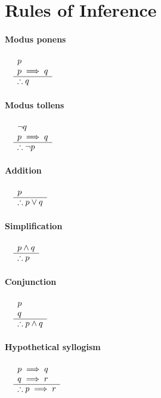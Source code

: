 \documentclass[a4paper]{article}
\begin{document}
\section{Rules of Inference}

\paragraph{Modus ponens}
  $\begin{array}{rl}
    & p \\
    & p \implies q \\
    \cline{2-2}
    &\therefore q
  \end{array}$
\paragraph{Modus tollens}
  $\begin{array}{rl}
    & \lnot q \\
    & p \implies q \\
    \cline{2-2}
    &\therefore \lnot p
  \end{array}$
\paragraph{Addition}
  $\begin{array}{rl}
    & p \\
    \cline{2-2}
    &\therefore p \lor q
  \end{array}$
\paragraph{Simplification}
  $\begin{array}{rl}
    & p \land q \\
    \cline{2-2}
    &\therefore p
  \end{array}$
\paragraph{Conjunction}
  $\begin{array}{rl}
    & p \\
    & q \\
    \cline{2-2}
    &\therefore p \land q
  \end{array}$
\paragraph{Hypothetical syllogism}
  $\begin{array}{rl}
    & p \implies q \\
    & q \implies r \\
    \cline{2-2}
    &\therefore p \implies r
  \end{array}$
\end{document}

